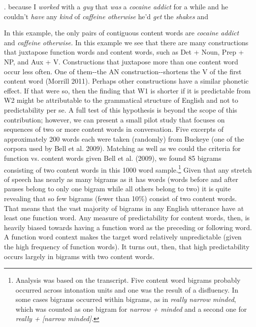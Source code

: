 \documentclass[12pt]{article}
\newenvironment{styleStandard}{\setlength\leftskip{0cm}\setlength\rightskip{0cm plus 1fil}\setlength\parindent{0cm}\setlength\parfillskip{0pt plus 1fil}\setlength\parskip{0in plus 1pt}\writerlistparindent\writerlistleftskip\leavevmode\normalfont\normalsize\writerlistlabel\ignorespaces}{\unskip\vspace{0.111in plus 0.0111in}\par}
\newcommand\writerlistleftskip{}
\newcommand\writerlistparindent{}
\newcommand\writerlistlabel{}
\begin{document}
\begin{styleStandard}
1. because I \textit{worked} with a \textit{guy} that \textit{was} a \textit{cocaine addict} for a while and he couldn't \textit{have} any \textit{kind} of \textit{caffeine otherwise} he'd \textit{get} the \textit{shakes} and
\end{styleStandard}

\begin{styleStandard}
In this example, the only pairs of contiguous content words are \textit{cocaine addict} and \textit{caffeine otherwise. }In this example we see that there are many constructions that juxtapose\textit{ }function words and content words, such as Det + Noun, Prep + NP, and Aux + V. Constructions that juxtapose more than one content word occur less often. One of them-{}-the AN construction-{}-shortens the V of the first content word (Morrill 2011). Perhaps other constructions have a similar phonetic effect. If that were so, then the finding that W1 is shorter if it is predictable from W2 might be attributable to the grammatical structure of English and not to predictability per se. A full test of this hypothesis is beyond the scope of this contribution; however, we can present a small pilot study that focuses on sequences of two or more content words in conversation. Five excerpts of approximately 200 words each were taken (randomly) from Buckeye (one of the corpora used by Bell et al. 2009). Matching as well as we could the criteria for function vs. content words given Bell et al. (2009), we found 85 bigrams consisting of two content words in this 1000 word sample.\footnote{ Analysis was based on the transcript. Five content word bigrams probably occurred across intonation units and one was the result of a disfluency. In some cases bigrams occurred within bigrams, as in \textit{really narrow minded}, which was counted as one bigram for \textit{narrow + minded} and a second one for \textit{really + [narrow minded].}} Given that any stretch of speech has nearly as many bigrams as it has words (words before and after pauses belong to only one bigram while all others belong to two) it is quite revealing that so few bigrams (fewer than 10\%) consist of two content words. That means that the vast majority of bigrams in any English utterance have at least one function word. Any measure of predictability for content words, then, is heavily biased towards having a function word as the preceding or following word. A function word context makes the target word relatively unpredictable (given the high frequency of function words). It turns out, then, that high predictability occurs largely in bigrams with two content words.
\end{styleStandard}
\end{document}
